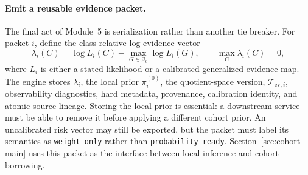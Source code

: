 \documentclass[11pt]{article}
\begin{document}
    \paragraph{Emit a reusable evidence packet.}
    The final act of Module~5 is serialization rather than another tie breaker. For packet
    $i$, define the class-relative log-evidence vector
    \begin{equation}
        \lambda_i(C)
        =\log L_i(C)-\max_{G\in\mathcal Q_0}\log L_i(G),
        \qquad \max_C\lambda_i(C)=0,
        \label{eq:focused-packet-log-evidence}
    \end{equation}
    where $L_i$ is either a stated likelihood or a calibrated generalized-evidence map.
    The engine stores $\lambda_i$, the local prior $\pi_i^{(0)}$, the quotient-space version,
    $\mathcal T_{\mathrm{ev},i}$, observability diagnostics, hard metadata, provenance,
    calibration identity, and atomic source lineage. Storing the local prior is essential:
    a downstream service must be able to remove it before applying a different cohort prior.
    An uncalibrated risk vector may still be exported, but the packet must label its semantics
    as \texttt{weight-only} rather than \texttt{probability-ready}. Section~\ref{sec:cohort-main}
    uses this packet as the interface between local inference and cohort borrowing.
\end{document}
